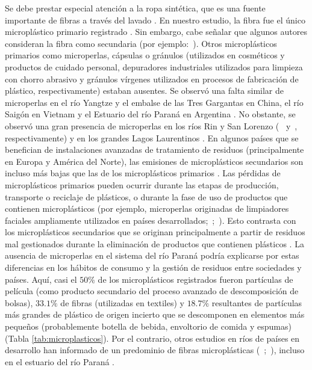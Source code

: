 Se debe prestar especial atención a la ropa sintética, que es una fuente importante de fibras a través del lavado \parencite{Conkle2018}. En nuestro estudio, la fibra fue el único microplástico primario registrado \parencite{COLLE20112588}. Sin embargo, cabe señalar que algunos autores consideran la fibra como secundaria (por ejemplo:~\cite{dris2015microplastic}). Otros microplásticos primarios como microperlas, cápsulas o gránulos (utilizados en cosméticos y productos de cuidado personal, depuradores industriales utilizados para limpieza con chorro abrasivo y gránulos vírgenes utilizados en procesos de fabricación de plástico, respectivamente) estaban ausentes. Se observó una falta similar de microperlas en el río Yangtze \parencite{ZHANG2015117} y el embalse de las Tres Gargantas \parencite{Zhang2017} en China, el río Saigón en Vietnam \parencite{LAHENS2018661} y el Estuario del río Paraná en Argentina \parencite{PAZOS2018134}. No obstante, se observó una gran presencia de microperlas en los ríos Rin y San Lorenzo (~\cite{Mani2015} y~\cite{doi:10.1139/cjfas-2014-0281}, respectivamente) y en los grandes Lagos Laurentinos \parencite{ERIKSEN2013177}. En algunos países que se benefician de instalaciones avanzadas de tratamiento de residuos (principalmente en Europa y América del Norte), las emisiones de microplásticos secundarios son incluso más bajas que las de los microplásticos primarios \parencite{gouin2015}. Las pérdidas de microplásticos primarios pueden ocurrir durante las etapas de producción, transporte o reciclaje de plásticos, o durante la fase de uso de productos que contienen microplásticos (por ejemplo, microperlas originadas de limpiadores faciales ampliamente utilizados en países desarrollados;~\cite{NAPPER2015178};~\cite{gouin2015}). Esto contrasta con los microplásticos secundarios que se originan principalmente a partir de residuos mal gestionados durante la eliminación de productos que contienen plásticos \parencite{Boucher2017}. La ausencia de microperlas en el sistema del río Paraná podría explicarse por estas diferencias en los hábitos de consumo y la gestión de residuos entre sociedades y países. Aquí, casi el $50\%$ de los microplásticos registrados fueron partículas de película (como producto secundario del proceso avanzado de descomposición de bolsas), $33.1\%$ de fibras (utilizadas en textiles) y $18.7\%$ resultantes de partículas más grandes de plástico de origen incierto que se descomponen en elementos más pequeños (probablemente botella de bebida, envoltorio de comida y espumas)(Tabla \ref{tab:microplasticos}). Por el contrario, otros estudios en ríos de países en desarrollo han informado de un predominio de fibras microplásticas (~\cite{ZHANG2015117};~\cite{LAHENS2018661}), incluso en el estuario del río Paraná \parencite{PAZOS2018134}.

